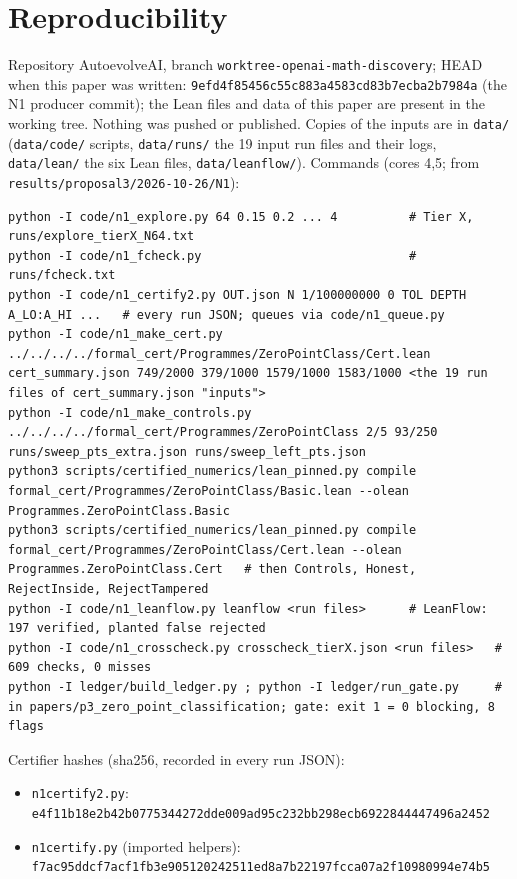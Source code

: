 \documentclass[10pt]{article}
\renewcommand{\_}{\textunderscore\penalty0\hspace{0pt}}
\begin{document}
\section{Reproducibility}\label{sec:repro}
Repository AutoevolveAI, branch \texttt{worktree-openai-math-discovery}; HEAD when this paper was written: \texttt{9efd4f85456c55c883a4583cd83b7ecba2b7984a} (the N1 producer commit); the Lean files and data of this paper are present in the working tree. Nothing was pushed or published. Copies of the inputs are in \texttt{data/} (\texttt{data/code/} scripts, \texttt{data/runs/} the 19 input run files and their logs, \texttt{data/lean/} the six Lean files, \texttt{data/leanflow/}). Commands (cores 4,5; from \texttt{results/proposal3/2026-10-26/N1}):
\begin{lstlisting}[basicstyle=\ttfamily\scriptsize]
python -I code/n1_explore.py 64 0.15 0.2 ... 4          # Tier X, runs/explore_tierX_N64.txt
python -I code/n1_fcheck.py                             # runs/fcheck.txt
python -I code/n1_certify2.py OUT.json N 1/100000000 0 TOL DEPTH A_LO:A_HI ...   # every run JSON; queues via code/n1_queue.py
python -I code/n1_make_cert.py ../../../../formal_cert/Programmes/ZeroPointClass/Cert.lean cert_summary.json 749/2000 379/1000 1579/1000 1583/1000 <the 19 run files of cert_summary.json "inputs">
python -I code/n1_make_controls.py ../../../../formal_cert/Programmes/ZeroPointClass 2/5 93/250 runs/sweep_pts_extra.json runs/sweep_left_pts.json
python3 scripts/certified_numerics/lean_pinned.py compile formal_cert/Programmes/ZeroPointClass/Basic.lean --olean Programmes.ZeroPointClass.Basic
python3 scripts/certified_numerics/lean_pinned.py compile formal_cert/Programmes/ZeroPointClass/Cert.lean --olean Programmes.ZeroPointClass.Cert   # then Controls, Honest, RejectInside, RejectTampered
python -I code/n1_leanflow.py leanflow <run files>      # LeanFlow: 197 verified, planted false rejected
python -I code/n1_crosscheck.py crosscheck_tierX.json <run files>   # 609 checks, 0 misses
python -I ledger/build_ledger.py ; python -I ledger/run_gate.py     # in papers/p3_zero_point_classification; gate: exit 1 = 0 blocking, 8 flags
\end{lstlisting}
Certifier hashes (sha256, recorded in every run JSON):
\begin{itemize}\scriptsize\itemsep=0pt
\item \texttt{n1\_certify2.py}: \texttt{e4f11b18e2b42b0775344272dde009ad95c232bb298ecb6922844447496a2452}
\item \texttt{n1\_certify.py} (imported helpers): \texttt{f7ac95ddcf7acf1fb3e905120242511ed8a7b22197fcca07a2f10980994e74b5}
\end{itemize}
\end{document}
